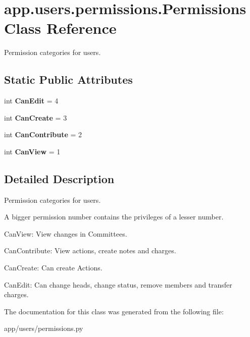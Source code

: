 \hypertarget{classapp_1_1users_1_1permissions_1_1_permissions}{}\section{app.\+users.\+permissions.\+Permissions Class Reference}
\label{classapp_1_1users_1_1permissions_1_1_permissions}


Permission categories for users.  


\subsection*{Static Public Attributes}
\begin{DoxyCompactItemize}
\item 
\mbox{\label{classapp_1_1users_1_1permissions_1_1_permissions_a91cbb1b3d525ea47ffe4b5b12bfe979e}} 
int {\bfseries Can\+Edit} = 4
\item 
\mbox{\label{classapp_1_1users_1_1permissions_1_1_permissions_aabbe27ce336c3209218a350fd4a46425}} 
int {\bfseries Can\+Create} = 3
\item 
\mbox{\label{classapp_1_1users_1_1permissions_1_1_permissions_a473f3e4b52e00caaac924ebe2967f398}} 
int {\bfseries Can\+Contribute} = 2
\item 
\mbox{\label{classapp_1_1users_1_1permissions_1_1_permissions_af5c7edc65060e65ac211996e10c5809a}} 
int {\bfseries Can\+View} = 1
\end{DoxyCompactItemize}


\subsection{Detailed Description}
Permission categories for users. 

A bigger permission number contains the privileges of a lesser number.


\begin{DoxyItemize}
\item Can\+View\+: View changes in Committees.
\item Can\+Contribute\+: View actions, create notes and charges.
\item Can\+Create\+: Can create Actions.
\item Can\+Edit\+: Can change heads, change status, remove members and transfer charges. 
\end{DoxyItemize}

The documentation for this class was generated from the following file\+:\begin{DoxyCompactItemize}
\item 
app/users/permissions.\+py\end{DoxyCompactItemize}
